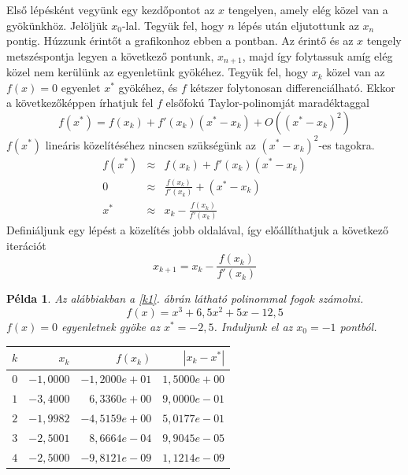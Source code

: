\documentclass[a4paper,12pt]{report}
\newtheorem{Pl}[Tet]{Példa}
\begin{document}
			Első lépésként vegyünk egy kezdőpontot az $x$ tengelyen, amely elég közel van a gyökünkhöz. Jelöljük $x_0$-lal. Tegyük fel, hogy $n$ lépés után eljutottunk az $x_n$ pontig. Húzzunk érintőt a grafikonhoz ebben a pontban. Az érintő és az $x$ tengely metszéspontja legyen a következő pontunk, $x_{n+1}$, majd így folytassuk amíg elég közel nem kerülünk az egyenletünk gyökéhez. Tegyük fel, hogy $x_k$ közel van az $f(x)=0$ egyenlet $x^*$ gyökéhez, és $f$ kétszer folytonosan differenciálható. Ekkor a következőképpen írhatjuk fel $f$ elsőfokú Taylor-polinomját maradéktaggal
			\[ f(x^*)=f(x_k)+f'(x_k)(x^*-x_{k})+O((x^*-x_{k})^2) \]
			$f(x^*)$ lineáris közelítéséhez nincsen szükségünk az $(x^*-x_{k})^2$-es tagokra.
			\begin{eqnarray*}
				f(x^*)&\approx& f(x_k)+f'(x_k)(x^*-x_{k})\\
				0&\approx&\frac{f(x_k)}{f'(x_k)}+(x^*-x_{k})\\
				x^*&\approx & x_k-\frac{f(x_k)}{f'(x_k)}
			\end{eqnarray*}
			Definiáljunk egy lépést a közelítés jobb oldalával, így előállíthatjuk a következő iterációt
			\begin{equation}
				 \label{e2} x_{k+1}=x_k-\frac{f(x_k)}{f'(x_k)}
			\end{equation}
			\begin{Pl}
				Az alábbiakban a \ref{k1}. ábrán látható polinommal fogok számolni.
				\[f(x)=x^3+6,\!5x^2+5x-12,\!5\]
				$f(x)=0$ egyenletnek gyöke az $x^*=-2,\!5$. Induljunk el az $x_0=-1$ pontból.
				\begin{center}
					\begin{tabular}{|r|r|r|r|}
						\hline
						$k$ & $x_k$     & $f(x_k)$      & $|x_k-x^*|$  \\ \hline
						$0$ & $-1,\!0000$ & $-1,\!2000e+01$ & $1,\!5000e+00$ \\ 
						$1$ & $-3,\!4000$ & $6,\!3360e+00$  & $9,\!0000e-01$ \\ 
						$2$ & $-1,\!9982$ & $-4,\!5159e+00$ & $5,\!0177e-01$ \\ 
						$3$ & $-2,\!5001$ & $8,\!6664e-04$  & $9,\!9045e-05$ \\ 
						$4$ & $-2,\!5000$ & $-9,\!8121e-09$ & $1,\!1214e-09$ \\
						\hline
					\end{tabular}
				\end{center}
			\end{Pl}
            
    	
        
\end{document}
